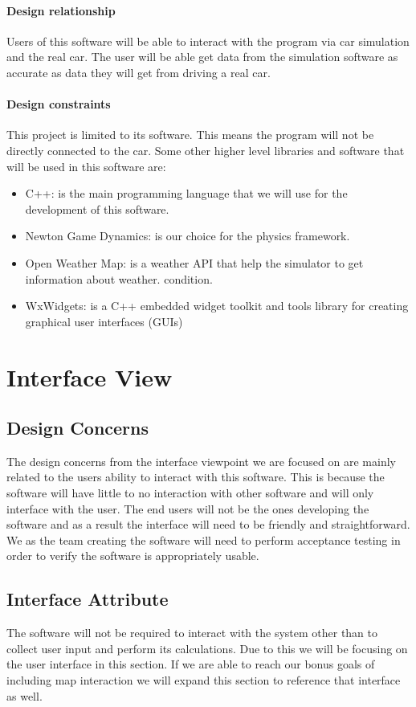 \documentclass[onecolumn, draftclsnofoot,10pt, compsoc]{IEEEtran}
\begin{document}
\paragraph{Design relationship}
Users of this software will be able to interact with the program via car simulation and the real car. The user will be able get data from the simulation software as accurate as data they will get from driving a real car. \paragraph{Design constraints}
This project is limited to its software. This means the program will not be directly connected to the car. Some other higher level libraries and software that will be used in this software are: 
\begin{itemize}
    \item C++: is the main programming language that we will use for the development of this software.
    \item Newton Game Dynamics: is our choice for the physics framework.
    \item Open Weather Map: is a weather API that help the simulator to get information about weather. condition. 
    \item WxWidgets: is a C++ embedded widget toolkit and tools library for creating graphical user interfaces (GUIs)
\end{itemize}

\section{Interface View}

\subsection{Design Concerns}
The design concerns from the interface viewpoint we are focused on are mainly related to the users ability to interact with this software.
This is because the software will have little to no interaction with other software and will only interface with the user.
The end users will not be the ones developing the software and as a result the interface will need to be friendly and straightforward. We as the team creating the software will need to perform acceptance testing in order to verify the software is appropriately usable.

\subsection{Interface Attribute}
The software will not be required to interact with the system other than to collect user input and perform its calculations.
Due to this we will be focusing on the user interface in this section.
If we are able to reach our bonus goals of including map interaction we will expand this section to reference that interface as well.
\end{document}
